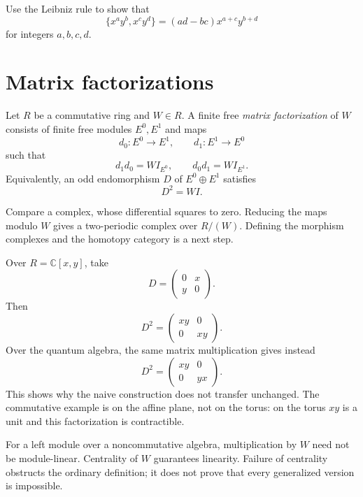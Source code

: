 \begin{exercise}
\label{exercise-laurent-bracket}
Use the Leibniz rule to show that
$$
\{x^a y^b,x^c y^d\}
=(ad-bc)x^{a+c}y^{b+d}
$$
for integers $a,b,c,d$.
\end{exercise}

\section{Matrix factorizations}
\label{section-matrix-factorizations}

\begin{definition}
\label{definition-matrix-factorization}
Let $R$ be a commutative ring and
$W\in R$. A finite free
\textit{matrix factorization} of $W$
consists of finite free modules
$E^0,E^1$ and maps
$$
d_0:E^0\longrightarrow E^1,
\qquad
d_1:E^1\longrightarrow E^0
$$
such that
$$
d_1d_0=W I_{E^0},
\qquad
d_0d_1=W I_{E^1}.
$$
Equivalently, an odd endomorphism $D$
of $E^0\oplus E^1$ satisfies
$$
D^2=W I.
$$
\end{definition}

\noindent
Compare a complex, whose differential
squares to zero. Reducing the maps
modulo $W$ gives a two-periodic complex
over $R/(W)$.
Defining the morphism complexes and the
homotopy category is a next step.

\begin{example}
\label{example-xy-factorization}
Over $R=\mathbb{C}[x,y]$, take
$$
D=\begin{pmatrix}0&x\\y&0\end{pmatrix}.
$$
Then
$$
D^2=\begin{pmatrix}xy&0\\0&xy\end{pmatrix}.
$$
Over the quantum algebra, the same
matrix multiplication gives instead
$$
D^2=\begin{pmatrix}xy&0\\0&yx\end{pmatrix}.
$$
This shows why the naive construction
does not transfer unchanged.
The commutative example is on the
affine plane, not on the torus:
on the torus $xy$ is a unit and
this factorization is contractible.
\end{example}

\noindent
For a left module over a noncommutative
algebra, multiplication by $W$ need
not be module-linear. Centrality of
$W$ guarantees linearity.
Failure of centrality obstructs the
ordinary definition; it does not prove
that every generalized version is
impossible.

